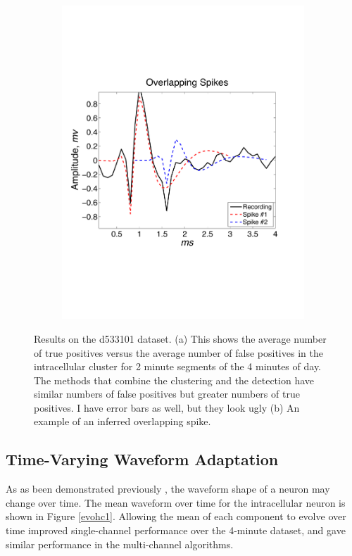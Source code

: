\begin{center}
\begin{figure}
\begin{subfigure}[b]{.49\textwidth}
\includegraphics[width=\textwidth]{../figs/alloverlappingspikes/olspike3}
\caption{}
\label{overlapping}
\end{subfigure}



\caption{Results on the d533101 dataset.  (a) This shows the average number of true positives versus the average number of false positives in the intracellular cluster for 2 minute segments of the 4 minutes of day.  The methods that combine the clustering and the detection have similar numbers of false positives but greater numbers of true positives. {\color{red} I have error bars as well, but they look ugly}  (b) An example of an inferred overlapping spike.}
\end{figure}
\end{center}
\subsection{Time-Varying Waveform Adaptation}
As as been demonstrated previously \cite{calabrese2011kalman}, the waveform shape of a neuron may change over time.  The mean waveform over time for the intracellular neuron is shown in Figure \ref{evohc1}.  Allowing the mean of each component to evolve over time improved single-channel performance over the 4-minute dataset, and gave similar performance in the multi-channel algorithms.
